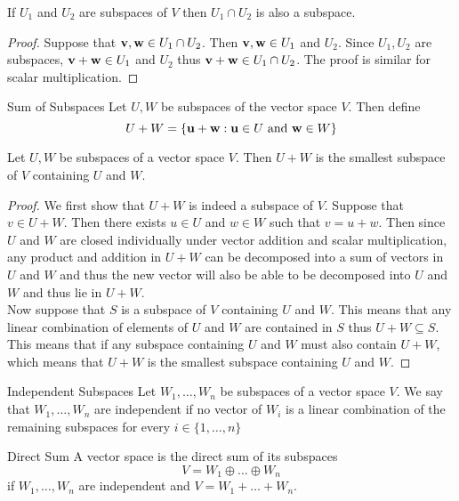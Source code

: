 \documentclass[a4paper]{article}
\begin{document}
\begin{prp}{}{} If $U_1$ and $U_2$ are subspaces of $V$ then $U_1\cap U_2$ is also a subspace. 
\begin{proof} Suppose that $\vb{v},\vb{w}\in U_1\cap U_2$. Then $\vb{v},\vb{w}\in U_1$ and $U_2$. Since $U_1,U_2$ are subspaces, $\vb{v}+\vb{w}\in U_1$ and $U_2$ thus $\vb{v}+\vb{w}\in U_1\cap U_2$. The proof is similar for scalar multiplication. 
\end{proof}
\end{prp}

\begin{defn}{Sum of Subspaces}{} Let $U,W$ be subspaces of the vector space $V$. Then define $$U+W=\{\vb{u}+\vb{w}:\vb{u}\in U\text{ and }\vb{w}\in W\}$$
\end{defn}

\begin{prp}{}{} Let $U,W$ be subspaces of a vector space $V$. Then $U+W$ is the smallest subspace of $V$ containing $U$ and $W$. 
\begin{proof}
We first show that $U+W$ is indeed a subspace of $V$. Suppose that $v\in U+W$. Then there exists $u\in U$ and $w\in W$ such that $v=u+w$. Then since $U$ and $W$ are closed individually under vector addition and scalar multiplication, any product and addition in $U+W$ can be decomposed into a sum of vectors in $U$ and $W$ and thus the new vector will also be able to be decomposed into $U$ and $W$ and thus lie in $U+W$. \\
Now suppose that $S$ is a subspace of $V$ containing $U$ and $W$. This means that any linear combination of elements of $U$ and $W$ are contained in $S$ thus $U+W\subseteq S$. This means that if any subspace containing $U$ and $W$ must also contain $U+W$, which means that $U+W$ is the smallest subspace containing $U$ and $W$. 
\end{proof}
\end{prp}

\begin{defn}{Independent Subspaces}{} Let $W_1,\dots,W_n$ be subspaces of a vector space $V$. We say that $W_1,\dots,W_n$ are independent if no vector of $W_i$ is a linear combination of the remaining subspaces for every $i\in\{1,\dots,n\}$
\end{defn}

\begin{defn}{Direct Sum}{} A vector space is the direct sum of its subspaces $$V=W_1\oplus\dots\oplus W_n$$ if $W_1,\dots,W_n$ are independent and $V=W_1+\dots+W_n$. 
\end{defn}
\end{document}
